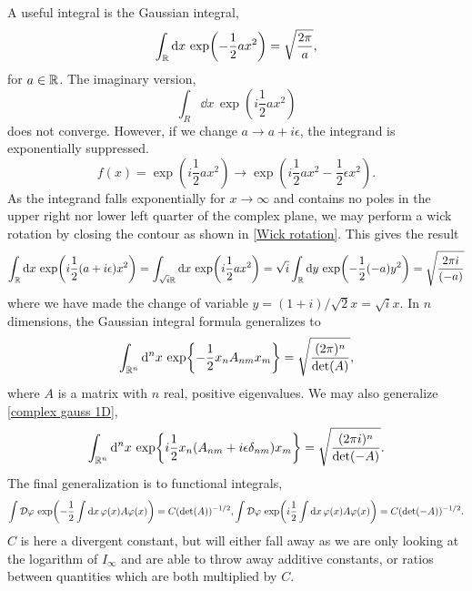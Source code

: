 A useful integral is the Gaussian integral,
\begin{equation}
    \int_{\mathbb{R}} \dd x \, \exp(- \frac{1}{2} a x^2) = \sqrt{\frac{2 \pi}{a}},
\end{equation}
for $a \in \mathbb{R}$. The imaginary version,
\begin{equation}
    \int_R \dd x \, \exp(i \frac{1}{2} a x^2 )
\end{equation}
does not converge. However, if we change $a \rightarrow a + i\epsilon$, the integrand is exponentially suppressed.
\begin{equation}
    f(x) = \exp(i \frac{1}{2}a x^2) \rightarrow
    \exp(i\frac{1}{2}a x^2 - \frac{1}{2} \epsilon  x^2).
\end{equation}
As the integrand falls exponentially for $x\rightarrow \infty$ and contains no poles in the upper right nor lower left quarter of the complex plane, we may perform a wick rotation by closing the contour as shown in \autoref{Wick rotation}.
This gives the result
\begin{equation}
    \label{complex gauss 1D}
    \int_{\mathbb{R}} \dd x \, \exp(i \frac{1}{2}(a + i\epsilon) x^2) 
    = \int_{\sqrt{i}\mathbb{R}} \dd x \, \exp(i\frac{1}{2} ax^2)
    = \sqrt{i} \int_{\mathbb{R}} \dd y\, \exp(-\frac{1}{2} (-a) y^2) = \sqrt{\frac{2 \pi i}{(-a)}}
\end{equation}
where we have made the change of variable $y = (1+i)/\sqrt{2} x = \sqrt{i} x$.
In $n$ dimensions, the Gaussian integral formula generalizes to
\begin{equation}
    \int_{\mathbb{R}^n} \dd^n x \, \exp{-\frac{1}{2} x_n A_{nm} x_m } =\sqrt{\frac{(2 \pi)^n}{\det(A)}},
\end{equation}
where $A$ is a matrix with $n$ real, positive eigenvalues.
We may also generalize \autoref{complex gauss 1D},
\begin{align}
    \int_{\mathbb{R}^n} \dd^n x \, \exp{i\frac{1}{2} x_n( A_{nm} + i \epsilon \delta_{nm}) x_m } =\sqrt{\frac{(2 \pi i )^n}{\det(-A)}}.
\end{align}
The final generalization is to functional integrals,
\begin{align}
    \int \mathcal{D} \varphi \, \exp(- \frac{1}{2} \int \dd x \, \varphi(x) A \varphi(x) )
    = C (\det(A))^{-1/2},
    \int \mathcal{D} \varphi \, \exp(i\frac{1}{2} \int \dd x \, \varphi(x) A \varphi(x) )
    = C (\det(-A))^{-1/2}.
\end{align}
$C$ is here a divergent constant, but will either fall away as we are only looking at the logarithm of $I_\infty$ and are able to throw away additive constants, or ratios between quantities which are both multiplied by $C$.

